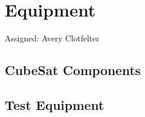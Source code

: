 \section{Equipment}
Assigned: Avery Clotfelter
\subsection{CubeSat Components}
\subsection{Test Equipment}
